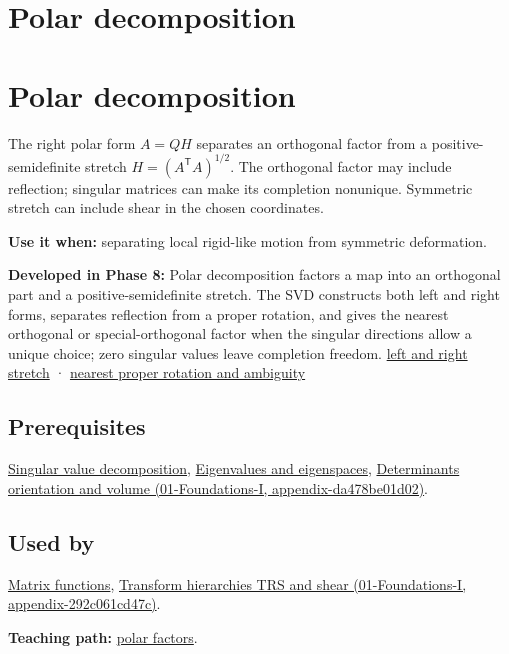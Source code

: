 \hypertarget{appendix-73f5bcf7a462}{}
\section*{Polar decomposition}
\section{Polar decomposition}\label{polar-decomposition}

The right polar form \(A=QH\) separates an orthogonal factor from a positive-semidefinite stretch \(H=(A^\mathsf T A)^{1/2}\). The orthogonal factor may include reflection; singular matrices can make its completion nonunique. Symmetric stretch can include shear in the chosen coordinates.

\textbf{Use it when:} separating local rigid-like motion from symmetric deformation.

\textbf{Developed in Phase 8:} Polar decomposition factors a map into an orthogonal part and a positive-semidefinite stretch. The SVD constructs both left and right forms, separates reflection from a proper rotation, and gives the nearest orthogonal or special-orthogonal factor when the singular directions allow a unique choice; zero singular values leave completion freedom. \href{Continuous\%20Notes/Computing\%20Foundations\%20-\%20From\%20Bits\%20to\%20C++\%20and\%20Systems\%20APIs\#Polar\%20decomposition\%20separates\%20frame\%20dependent\%20stretch\%20from\%20orientation}{left and right stretch} · \href{Continuous\%20Notes/Computing\%20Foundations\%20-\%20From\%20Bits\%20to\%20C++\%20and\%20Systems\%20APIs\#Two-sided\%20rotations,\%20nearest\%20proper\%20rotation,\%20and\%20nonunique\%20directions}{nearest proper rotation and ambiguity}

\subsection{Prerequisites}\label{prerequisites}

\hyperref[appendix-1fad5e7f36fa]{Singular value decomposition}, \hyperref[appendix-0b3be18411f9]{Eigenvalues and eigenspaces}, \href{}{Determinants orientation and volume (01-Foundations-I, appendix-da478be01d02)}.

\subsection{Used by}\label{used-by}

\hyperref[appendix-0f4bc2bf2b1f]{Matrix functions}, \href{}{Transform hierarchies TRS and shear (01-Foundations-I, appendix-292c061cd47c)}.

\textbf{Teaching path:} \href{Continuous\%20Notes/Computing\%20Foundations\%20-\%20From\%20Bits\%20to\%20C++\%20and\%20Systems\%20APIs\#Polar\%20decomposition\%20separates\%20rotation-like\%20motion\%20from\%20stretch}{polar factors}.
